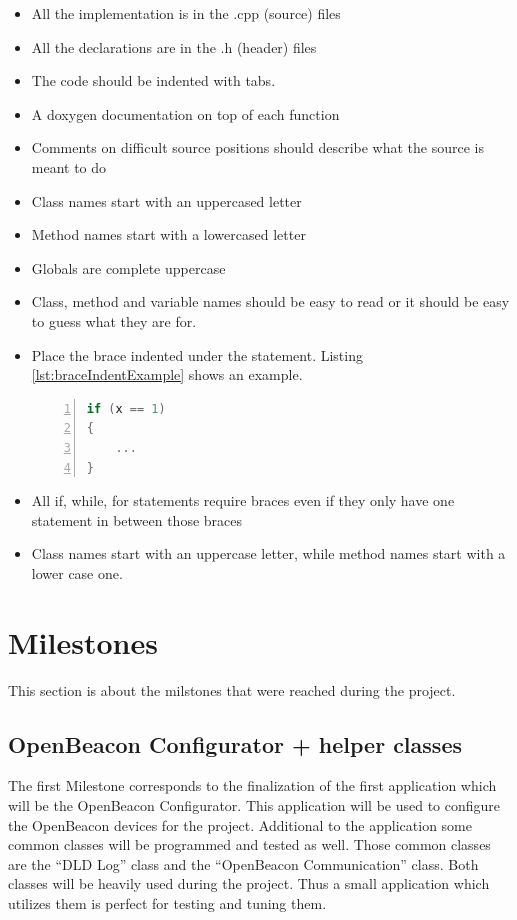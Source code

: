   \begin{itemize}
   \item All the implementation is in the .cpp (source) files
   \item All the declarations are in the .h (header) files
   \item The code should be indented with tabs.
   \item A doxygen documentation on top of each function
   \item Comments on difficult source positions should describe what the source is meant to do
   \item Class names start with an uppercased letter
   \item Method names start with a lowercased letter
   \item Globals are complete uppercase
   \item Class, method and variable names should be easy to read or it should be easy to guess what they are for.
   \item Place the brace indented under the statement. Listing \ref{lst:braceIndentExample} shows an example.\\
    \begin{lstlisting}[frame=single,language=C++,breaklines,basicstyle=\footnotesize,numbers=left,label=lst:braceIndentExample,captionpos=b,caption={Example of right placement of braces}]
if (x == 1)
{
	...
}
    \end{lstlisting}
   \item All if, while, for statements require braces even if they only have one statement in between those braces
   \item Class names start with an uppercase letter, while method names start with a lower case one.
  \end{itemize}

 \section{Milestones}
  This section is about the milstones that were reached during the project.

  \subsection{OpenBeacon Configurator + helper classes}
   The first Milestone corresponds to the finalization of the first application which will be the OpenBeacon Configurator. This application will be used to configure the OpenBeacon devices for the project. Additional to the application some common classes will be programmed and tested as well. Those common classes are the ``DLD Log'' class and the ``OpenBeacon Communication'' class. Both classes will be heavily used during the project. Thus a small application which utilizes them is perfect for testing and tuning them.

